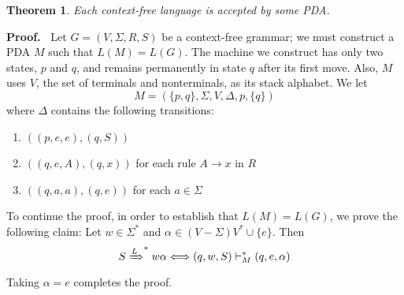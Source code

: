 \documentclass[aps,pra,onecolumn,notitlepage,superscriptaddress]{revtex4-1}
\def\ys{\vdash^*}
\newtheorem{theo}{Theorem}
\def\Proof{{\bf Proof.~}}
\begin{document}
    \begin{theo}
        Each context-free language is accepted by some PDA. 
    \end{theo}
    \Proof
    Let $G = (V, \Sigma, R, S)$ be a context-free grammar; we must construct a PDA $M$ such that $L(M) = L(G)$. The machine we construct has only two states, $p$ and $q$, and remains permanently in state $q$ after its first move. Also, $M$ uses $V$, the set of terminals and nonterminals, as its stack alphabet. We let
    \begin{equation}
        M = (\{p,q\}, \Sigma, V, \Delta, p, \{q\})
    \end{equation}
    where $\Delta$ contains the following transitions:
    \begin{enumerate}
        \item $((p,e,e),(q,S))$
        \item $((q,e,A),(q,x))$ for each rule $A \to x$ in $R$
        \item $((q,a,a),(q,e))$ for each $a \in \Sigma$
    \end{enumerate}


    To continue the proof, in order to establish that $L(M) = L(G)$, we prove the following claim: Let $w \in \Sigma^*$ and $\alpha \in (V-\Sigma)V^* \cup \{ e \}$. Then
    \begin{equation}
        S \xRightarrow{L}^* w\alpha \Longleftrightarrow (q,w,S) \ys_M (q,e,\alpha)
    \end{equation}
    Taking $\alpha = e$ completes the proof.
\end{document}
